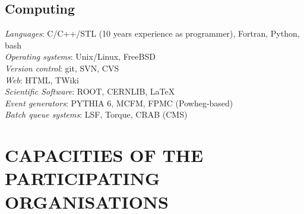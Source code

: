 \documentclass[a4paper,11pt]{article}
\begin{document}
\subsection*{Computing}
\textit{Languages}: C/C++/STL (10 years experience as programmer), Fortran, Python, bash\\
\textit{Operating systems}: Unix/Linux, FreeBSD\\
\textit{Version control}: git, SVN, CVS\\
\textit{Web}: HTML, TWiki\\
\textit{Scientific Software}: ROOT, CERNLIB, \LaTeX\\
\textit{Event generators}: PYTHIA 6, MCFM, FPMC (Powheg-based)\\
\textit{Batch queue systems}: LSF, Torque, CRAB (CMS)



\newpage
\section{CAPACITIES OF THE PARTICIPATING ORGANISATIONS}
\label{sec:capacities}
\vspace{\baselineskip}
\end{document}

